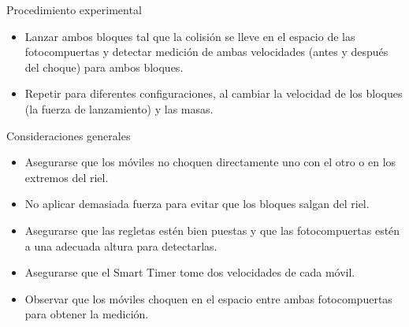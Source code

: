\documentclass{article}
\begin{document}
\begin{multicols}{2}
Procedimiento experimental
\begin{itemize}
\item Lanzar ambos bloques tal que la colisión se lleve en el espacio de las fotocompuertas y detectar medición de ambas velocidades (antes y después del choque) para ambos bloques.
\item Repetir para diferentes configuraciones, al cambiar la velocidad de los bloques (la fuerza de lanzamiento) y las masas.
\end{itemize}

Consideraciones generales
\begin{itemize}
\item Asegurarse que los móviles no choquen directamente uno con el otro o en los extremos del riel.
\item No aplicar demasiada fuerza para evitar que los bloques salgan del riel.
\item Asegurarse que las regletas estén bien puestas y que las fotocompuertas estén a una adecuada altura para detectarlas.
\item Asegurarse que el Smart Timer tome dos velocidades de cada móvil.
\item Observar que los móviles choquen en el espacio entre ambas fotocompuertas para obtener la medición.
\end{itemize}







\end{multicols}
\end{document}
